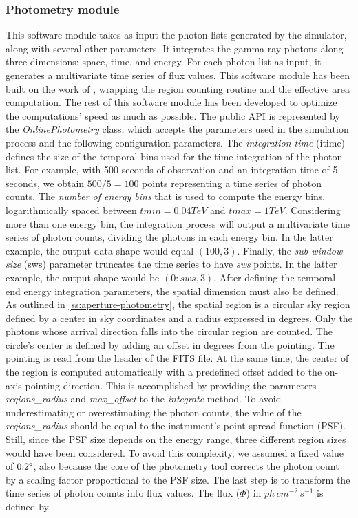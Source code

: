 \subsubsection{Photometry module}
\label{ss:photometry-module}
This software module takes as input the photon lists generated by the simulator, along with several other parameters. It integrates the gamma-ray photons along three dimensions: space, time, and energy. For each photon list as input, it generates a multivariate time series of flux values. This software module has been built on the work of \cite{tampieri2020real}, wrapping the region counting routine and the effective area computation. The rest of this software module has been developed to optimize the computations' speed as much as possible. 
The public API is represented by the \textit{OnlinePhotometry} class, which accepts the parameters used in the simulation process and the following configuration parameters. The \textit{integration time} (itime) defines the size of the temporal bins used for the time integration of the photon list. For example, with 500 seconds of observation and an integration time of 5 seconds, we obtain $500/5=100$ points representing a time series of photon counts. The \textit{number of energy bins} that is used to compute the energy bins, logarithmically spaced between $tmin=0.04 TeV$ and $tmax=1 TeV$. Considering more than one energy bin, the integration process will output a multivariate time series of photon counts, dividing the photons in each energy bin. In the latter example, the output data shape would equal $(100,3)$. Finally, the \textit{sub-window size} (sws) parameter truncates the time series to have \textit{sws} points. In the latter example, the output shape would be $(0:sws, 3)$. After defining the temporal end energy integration parameters, the spatial dimension must also be defined. As outlined in \autoref{ss:aperture-photometry}, the spatial region is a circular sky region defined by a center in sky coordinates and a radius expressed in degrees. Only the photons whose arrival direction falls into the circular region are counted. The circle's center is defined by adding an offset in degrees from the pointing. The pointing is read from the header of the FITS file. At the same time, the center of the region is computed automatically with a predefined offset added to the on-axis pointing direction. This is accomplished by providing the parameters \textit{regions\_radius} and \textit{max\_offset} to the \textit{integrate} method. To avoid underestimating or overestimating the photon counts, the value of the \textit{regions\_radius} should be equal to the instrument's point spread function (PSF). Still, since the PSF size depends on the energy range, three different region sizes would have been considered. To avoid this complexity, we assumed a fixed value of $0.2\degree$, also because the core of the photometry tool \cite{tampieri2020real} corrects the photon count by a scaling factor proportional to the PSF size. The last step is to transform the time series of photon counts into flux values. The flux ($\Phi$) in $ph\,cm^{-2}\,s^{-1}$ is defined by
